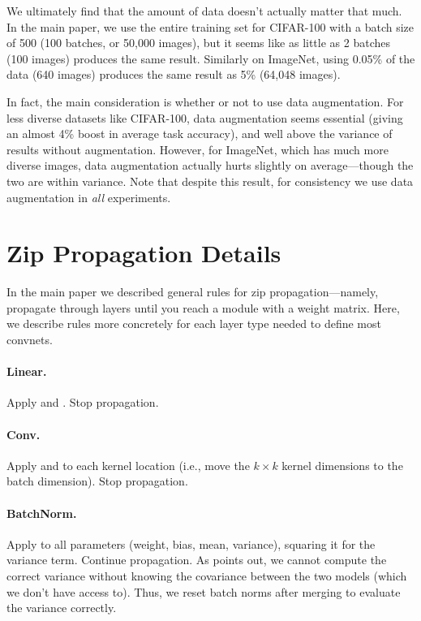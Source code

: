 

We ultimately find that the amount of data doesn't actually matter that much. In the main paper, we use the entire training set for CIFAR-100 with a batch size of 500 (100 batches, or 50,000 images), but it seems like as little as 2 batches (100 images) produces the same result. Similarly on ImageNet, using 0.05\% of the data (640 images) produces the same result as 5\% (64,048 images).

In fact, the main consideration is whether or not to use data augmentation. For less diverse datasets like CIFAR-100, data augmentation seems essential (giving an almost 4\% boost in average task accuracy), and well above the variance of results without augmentation. However, for ImageNet, which has much more diverse images, data augmentation actually hurts slightly on average---though the two are within variance. Note that despite this result, for consistency we use data augmentation in \textit{all} experiments.


\section{Zip Propagation Details} \label{ap:prop_rules}
In the main paper we described general rules for zip propagation---namely, propagate through layers until you reach a module with a weight matrix. Here, we describe rules more concretely for each layer type needed to define most convnets.

\paragraph{Linear.} Apply  and . Stop propagation.

\paragraph{Conv.} Apply  and  to each kernel location (i.e., move the $k\times k$ kernel dimensions to the batch dimension). Stop propagation.

\paragraph{BatchNorm.} Apply  to all parameters (weight, bias, mean, variance), squaring it for the variance term. Continue propagation. As \citet{jordan2022repair} points out, we cannot compute the correct variance without knowing the covariance between the two models (which we don't have access to). Thus, we reset batch norms after merging to evaluate the variance correctly. 

